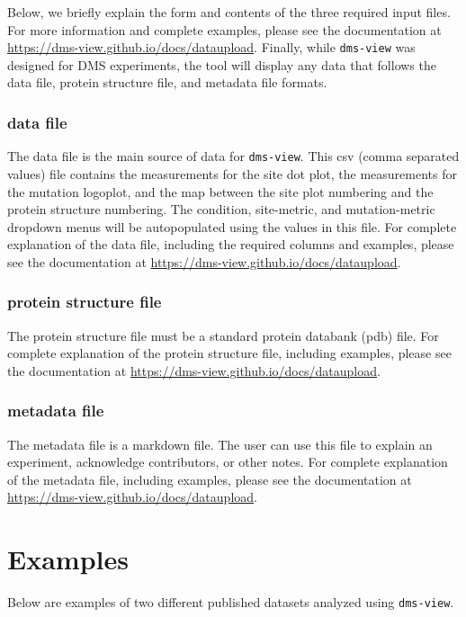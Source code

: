 Below, we briefly explain the form and contents of the three required input files.
For more information and complete examples, please see the documentation at \url{https://dms-view.github.io/docs/dataupload}.
Finally, while \texttt{dms-view} was designed for DMS experiments, the tool will display any data that follows the data file, protein structure file, and metadata file formats.

\subsubsection{data file}

The data file is the main source of data for \texttt{dms-view}.
This csv (comma separated values) file contains the measurements for the site dot plot, the measurements for the mutation logoplot, and the map between the site plot numbering and the protein structure numbering.
The condition, site-metric, and mutation-metric dropdown menus will be autopopulated using the values in this file.
For complete explanation of the data file, including the required columns and examples, please see the documentation at \url{https://dms-view.github.io/docs/dataupload}.

\subsubsection{protein structure file}

The protein structure file must be a standard protein databank (pdb) file.
For complete explanation of the protein structure file, including examples, please see the documentation at \url{https://dms-view.github.io/docs/dataupload}.

\subsubsection{metadata file}

The metadata file is a markdown file.
The user can use this file to explain an experiment, acknowledge contributors, or other notes.
For complete explanation of the metadata file, including examples, please see the documentation at \url{https://dms-view.github.io/docs/dataupload}.

\section{Examples}

Below are examples of two different published datasets analyzed using \texttt{dms-view}.

